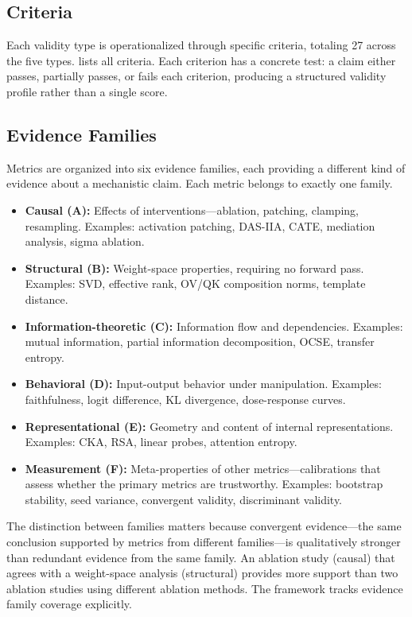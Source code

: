 \documentclass[10pt]{article}
\begin{document}
\subsection{Criteria}
\label{sec:criteria}

Each validity type is operationalized through specific criteria, totaling 27 across the five types.  lists all criteria. Each criterion has a concrete test: a claim either passes, partially passes, or fails each criterion, producing a structured validity profile rather than a single score.


\subsection{Evidence Families}
\label{sec:evidence-families}

Metrics are organized into six evidence families, each providing a different kind of evidence about a mechanistic claim. Each metric belongs to exactly one family.

\begin{itemize}[nosep]
    \item \textbf{Causal (A):} Effects of interventions---ablation, patching, clamping, resampling. Examples: activation patching, DAS-IIA, CATE, mediation analysis, sigma ablation.
    \item \textbf{Structural (B):} Weight-space properties, requiring no forward pass. Examples: SVD, effective rank, OV/QK composition norms, template distance.
    \item \textbf{Information-theoretic (C):} Information flow and dependencies. Examples: mutual information, partial information decomposition, OCSE, transfer entropy.
    \item \textbf{Behavioral (D):} Input-output behavior under manipulation. Examples: faithfulness, logit difference, KL divergence, dose-response curves.
    \item \textbf{Representational (E):} Geometry and content of internal representations. Examples: CKA, RSA, linear probes, attention entropy.
    \item \textbf{Measurement (F):} Meta-properties of other metrics---calibrations that assess whether the primary metrics are trustworthy. Examples: bootstrap stability, seed variance, convergent validity, discriminant validity.
\end{itemize}

The distinction between families matters because convergent evidence---the same conclusion supported by metrics from different families---is qualitatively stronger than redundant evidence from the same family. An ablation study (causal) that agrees with a weight-space analysis (structural) provides more support than two ablation studies using different ablation methods. The framework tracks evidence family coverage explicitly.
\end{document}
